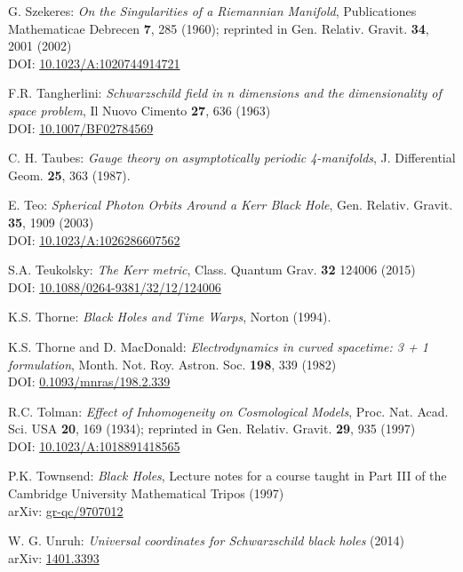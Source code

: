 \begin{thebibliography}{123}
G. Szekeres: {\em On the Singularities of a Riemannian Manifold},
Publicationes Mathematicae Debrecen {\bf 7}, 285 (1960); reprinted in
Gen. Relativ. Gravit. {\bf 34}, 2001 (2002)\\
DOI: \href{https://doi.org/10.1023/A:1020744914721}{10.1023/A:1020744914721}

F.R. Tangherlini:
{\em Schwarzschild field in n dimensions and the dimensionality of space problem},
Il Nuovo Cimento {\bf 27}, 636 (1963)\\
DOI: \href{https://doi.org/10.1007/BF02784569}{10.1007/BF02784569}

C. H. Taubes: {\em Gauge theory on asymptotically periodic 4-manifolds},
J. Differential Geom. {\bf 25}, 363 (1987).

E. Teo: {\em Spherical Photon Orbits Around a Kerr Black Hole},
Gen. Relativ. Gravit. {\bf 35}, 1909 (2003)\\
DOI: \href{https://doi.org/10.1023/A:1026286607562}{10.1023/A:1026286607562}

S.A. Teukolsky: {\em The Kerr metric},
Class. Quantum Grav. {\bf 32} 124006 (2015)\\
DOI: \href{https://doi.org/10.1088/0264-9381/32/12/124006}{10.1088/0264-9381/32/12/124006}

K.S. Thorne: {\em Black Holes and Time Warps}, Norton (1994).

K.S. Thorne and D. MacDonald: {\em Electrodynamics in curved spacetime: 3 + 1 formulation},
Month. Not. Roy. Astron. Soc. {\bf 198}, 339 (1982)\\
DOI: \href{https://doi.org/10.1093/mnras/198.2.339}{0.1093/mnras/198.2.339}

R.C. Tolman:
{\em Effect of Inhomogeneity on Cosmological Models},
Proc. Nat. Acad. Sci. USA {\bf 20}, 169 (1934);
reprinted in Gen. Relativ. Gravit. {\bf 29}, 935 (1997)\\
DOI: \href{https://doi.org/10.1023/A:1018891418565}{10.1023/A:1018891418565}

P.K. Townsend: {\em Black Holes}, Lecture notes for a course taught in Part III
of the Cambridge University Mathematical Tripos (1997) \\
arXiv: \href{https://arxiv.org/abs/gr-qc/9707012}{gr-qc/9707012}

W. G. Unruh: {\em Universal coordinates for Schwarzschild black holes} (2014)\\
arXiv: \href{https://arxiv.org/abs/1401.3393}{1401.3393}


\end{thebibliography}
